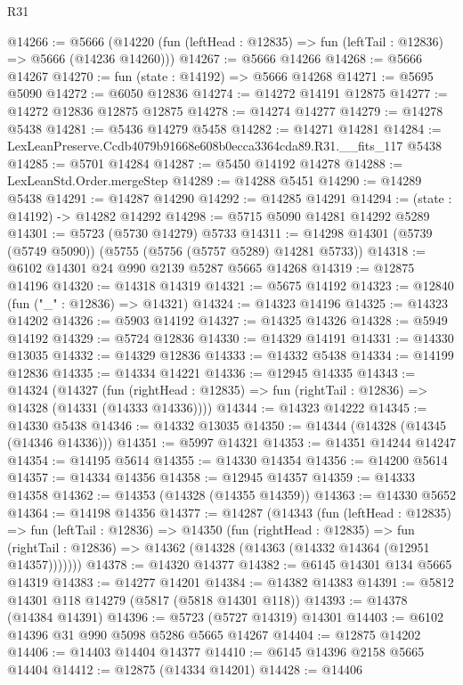 \begin{lexlean}{R31}
\begin{coremodule}
@14266 := @5666
    (@14220 (fun (leftHead : @12835) => fun (leftTail : @12836) => @5666 (@14236 @14260)))
@14267 := @5666 @14266
@14268 := @5666 @14267
@14270 := fun (state : @14192) => @5666 @14268
@14271 := @5695 @5090
@14272 := @6050 @12836
@14274 := @14272 @14191 @12875
@14277 := @14272 @12836 @12875 @12875
@14278 := @14274 @14277
@14279 := @14278 @5438
@14281 := @5436 @14279 @5458
@14282 := @14271 @14281
@14284 := LexLeanPreserve.Ccdb4079b91668e608b0ecca3364cda89.R31.__fits_117 @5438
@14285 := @5701 @14284
@14287 := @5450 @14192 @14278
@14288 := LexLeanStd.Order.mergeStep
@14289 := @14288 @5451
@14290 := @14289 @5438
@14291 := @14287 @14290
@14292 := @14285 @14291
@14294 := (state : @14192) -> @14282 @14292
@14298 := @5715 @5090 @14281 @14292 @5289
@14301 := @5723 (@5730 @14279) @5733
@14311 := @14298 @14301 (@5739 (@5749 @5090)) (@5755 (@5756 (@5757 @5289) @14281 @5733))
@14318 := @6102 @14301 @24 @990 @2139 @5287 @5665 @14268
@14319 := @12875 @14196
@14320 := @14318 @14319
@14321 := @5675 @14192
@14323 := @12840 (fun ("_" : @12836) => @14321)
@14324 := @14323 @14196
@14325 := @14323 @14202
@14326 := @5903 @14192
@14327 := @14325 @14326
@14328 := @5949 @14192
@14329 := @5724 @12836
@14330 := @14329 @14191
@14331 := @14330 @13035
@14332 := @14329 @12836
@14333 := @14332 @5438
@14334 := @14199 @12836
@14335 := @14334 @14221
@14336 := @12945 @14335
@14343 := @14324
    (@14327
      (fun (rightHead : @12835) => fun (rightTail : @12836) => @14328 (@14331 (@14333 @14336))))
@14344 := @14323 @14222
@14345 := @14330 @5438
@14346 := @14332 @13035
@14350 := @14344 (@14328 (@14345 (@14346 @14336)))
@14351 := @5997 @14321
@14353 := @14351 @14244 @14247
@14354 := @14195 @5614
@14355 := @14330 @14354
@14356 := @14200 @5614
@14357 := @14334 @14356
@14358 := @12945 @14357
@14359 := @14333 @14358
@14362 := @14353 (@14328 (@14355 @14359))
@14363 := @14330 @5652
@14364 := @14198 @14356
@14377 := @14287
    (@14343
      (fun (leftHead : @12835) =>
      fun (leftTail : @12836) =>
      @14350
        (fun (rightHead : @12835) =>
        fun (rightTail : @12836) => @14362 (@14328 (@14363 (@14332 @14364 (@12951 @14357)))))))
@14378 := @14320 @14377
@14382 := @6145 @14301 @134 @5665 @14319
@14383 := @14277 @14201
@14384 := @14382 @14383
@14391 := @5812 @14301 @118 @14279 (@5817 (@5818 @14301 @118))
@14393 := @14378 (@14384 @14391)
@14396 := @5723 (@5727 @14319) @14301
@14403 := @6102 @14396 @31 @990 @5098 @5286 @5665 @14267
@14404 := @12875 @14202
@14406 := @14403 @14404 @14377
@14410 := @6145 @14396 @2158 @5665 @14404
@14412 := @12875 (@14334 @14201)
@14428 := @14406

\end{coremodule}
\end{lexlean}
